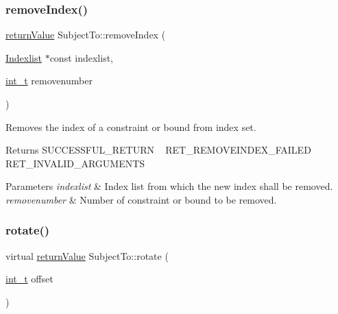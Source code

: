 \subsubsection{\texorpdfstring{remove\+Index()}{removeIndex()}}
{\footnotesize\ttfamily \hyperlink{_message_handling_8hpp_a81d556f613bfbabd0b1f9488c0fa865e}{return\+Value} Subject\+To\+::remove\+Index (\begin{DoxyParamCaption}\item[{\hyperlink{class_indexlist}{Indexlist} $\ast$const}]{indexlist,  }\item[{\hyperlink{_types_8hpp_ab6fd6105e64ed14a0c9281326f05e623}{int\+\_\+t}}]{removenumber }\end{DoxyParamCaption})\hspace{0.3cm}{\ttfamily [protected]}}

Removes the index of a constraint or bound from index set. \begin{DoxyReturn}{Returns}
S\+U\+C\+C\+E\+S\+S\+F\+U\+L\+\_\+\+R\+E\+T\+U\+RN ~\newline
 R\+E\+T\+\_\+\+R\+E\+M\+O\+V\+E\+I\+N\+D\+E\+X\+\_\+\+F\+A\+I\+L\+ED ~\newline
 R\+E\+T\+\_\+\+I\+N\+V\+A\+L\+I\+D\+\_\+\+A\+R\+G\+U\+M\+E\+N\+TS 
\end{DoxyReturn}

\begin{DoxyParams}{Parameters}
{\em indexlist} & Index list from which the new index shall be removed. \\
\hline
{\em removenumber} & Number of constraint or bound to be removed. \\
\hline
\end{DoxyParams}
\mbox{\label{class_subject_to_a6e3b466f01422cc7361e7a8d1f007aa6}} 
\subsubsection{\texorpdfstring{rotate()}{rotate()}}
{\footnotesize\ttfamily virtual \hyperlink{_message_handling_8hpp_a81d556f613bfbabd0b1f9488c0fa865e}{return\+Value} Subject\+To\+::rotate (\begin{DoxyParamCaption}\item[{\hyperlink{_types_8hpp_ab6fd6105e64ed14a0c9281326f05e623}{int\+\_\+t}}]{offset }\end{DoxyParamCaption})\hspace{0.3cm}{\ttfamily [pure virtual]}}

